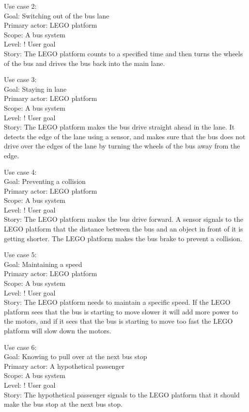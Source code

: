Use case 2:\\
Goal: Switching out of the bus lane\\
Primary actor: LEGO platform\\
Scope: A bus system\\
Level: ! User goal\\
Story: The LEGO platform counts to a specified time and then turns the wheels of the bus and drives the bus back into the main lane.

Use case 3:\\
Goal: Staying in lane\\
Primary actor: LEGO platform\\
Scope: A bus system\\
Level: ! User goal\\
Story: The LEGO platform makes the bus drive straight ahead in the lane. It detects the edge of the lane using a sensor, and makes sure that the bus does not drive over the edges of the lane by turning the wheels of the bus away from the edge.

Use case 4:\\
Goal: Preventing a collision\\
Primary actor: LEGO platform\\
Scope: A bus system\\
Level: ! User goal\\
Story: The LEGO platform makes the bus drive forward. A sensor signals to the LEGO platform that the distance between the bus and an object in front of it is getting shorter. The LEGO platform makes the bus brake to prevent a collision.

Use case 5:\\
Goal: Maintaining a speed\\
Primary actor: LEGO platform\\
Scope: A bus system\\
Level: ! User goal\\
Story: The LEGO platform needs to maintain a specific speed. 
If the LEGO platform sees that the bus is starting to move slower it will add more power to the motors, and if it sees that the bus is starting to move too fast the LEGO platform will slow down the motors.

Use case 6:\\
Goal: Knowing to pull over at the next bus stop\\
Primary actor: A hypothetical passenger\\
Scope: A bus system\\
Level: ! User goal\\
Story: The hypothetical passenger signals to the LEGO platform that it should make the bus stop at the next bus stop.

